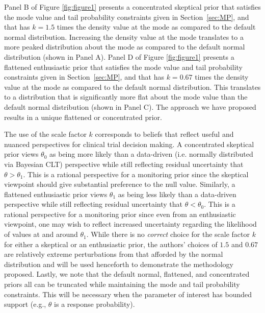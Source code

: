 \documentclass[12pt]{article}
\begin{document}
{Panel B of Figure \ref{fig:figure1} presents a concentrated skeptical prior that satisfies 
the mode value and tail probability constraints given in Section~\ref{sec:MP}, and that has $k=1.5$ times the density value at the mode as compared to the default normal distribution. 
Increasing the density value at the mode translates to a more peaked distribution about the mode as compared to the default normal distribution (shown in Panel A). 
%
Panel D of Figure \ref{fig:figure1} presents a flattened enthusiastic prior that satisfies the mode value and tail probability constraints given in Section~\ref{sec:MP}, and
that has $k=0.67$ times the density value at the mode as compared to the default normal distribution. This translates to a distribution that is significantly more flat about the mode value than the default normal distribution (shown in Panel C). 
%
%
The approach we have proposed results in a unique flattened or concentrated prior.

The use of the scale factor $k$ corresponds to beliefs that reflect useful and nuanced perspectives for clinical trial decision making.
%
A concentrated skeptical prior views $\theta_0$ as being more likely than a data-driven (i.e. normally distributed via Bayesian CLT) perspective while still reflecting residual uncertainty that $\theta>\theta_1$.
%
This is a rational perspective for a monitoring prior since the skeptical viewpoint should give substantial preference to the null value.
%
Similarly, a flattened enthusiastic prior views $\theta_1$ as being less likely than a data-driven perspective while still reflecting residual uncertainty that $\theta<\theta_0$.
%
This is a rational perspective for a monitoring prior since even from an enthusiastic viewpoint, one may wish to reflect increased uncertainty regarding the likelihood of values at and around $\theta_1$.
%
While there is no \textit{correct} choice for the scale factor $k$ for either a skeptical or an enthusiastic prior, the authors' choices
of $1.5$ and $0.67$ are relatively extreme perturbations from that afforded by the normal distribution and will be used henceforth to 
demonstrate the methodology proposed. 
Lastly, we note that the default normal, flattened, and concentrated priors all can be truncated while maintaining the mode and tail 
probability constraints.
This will be necessary when the parameter of interest has bounded support (e.g., $\theta$ is a response probability).
}
\end{document}
